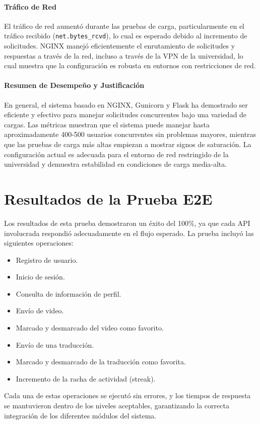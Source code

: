 \paragraph{Tráfico de Red}
El tráfico de red aumentó durante las pruebas de carga, particularmente en el tráfico recibido (\texttt{net.bytes\_rcvd}), lo cual es esperado debido al incremento de solicitudes. NGINX manejó eficientemente el enrutamiento de solicitudes y respuestas a través de la red, incluso a través de la VPN de la universidad, lo cual muestra que la configuración es robusta en entornos con restricciones de red.

\paragraph{Resumen de Desempeño y Justificación}
En general, el sistema basado en NGINX, Gunicorn y Flask ha demostrado ser eficiente y efectivo para manejar solicitudes concurrentes bajo una variedad de cargas. Las métricas muestran que el sistema puede manejar hasta aproximadamente 400-500 usuarios concurrentes sin problemas mayores, mientras que las pruebas de carga más altas empiezan a mostrar signos de saturación. La configuración actual es adecuada para el entorno de red restringido de la universidad y demuestra estabilidad en condiciones de carga media-alta.

\section{Resultados de la Prueba E2E}
Los resultados de esta prueba demostraron un éxito del 100\%, ya que cada API involucrada respondió adecuadamente en el flujo esperado. La prueba incluyó las siguientes operaciones:
\begin{itemize}
    \item Registro de usuario.
    \item Inicio de sesión.
    \item Consulta de información de perfil.
    \item Envío de video.
    \item Marcado y desmarcado del video como favorito.
    \item Envío de una traducción.
    \item Marcado y desmarcado de la traducción como favorita.
    \item Incremento de la racha de actividad (streak).
\end{itemize}

Cada una de estas operaciones se ejecutó sin errores, y los tiempos de respuesta se mantuvieron dentro de los niveles aceptables, garantizando la correcta integración de los diferentes módulos del sistema.

